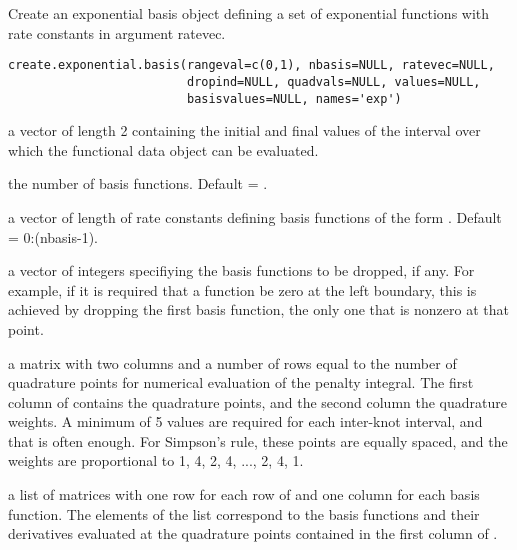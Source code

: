 \documentclass{article}
\begin{document}
\begin{Description}\relax
Create an exponential basis object defining a set of exponential
functions with rate constants in argument ratevec.
\end{Description}
\begin{Usage}
\begin{verbatim}
create.exponential.basis(rangeval=c(0,1), nbasis=NULL, ratevec=NULL,
                         dropind=NULL, quadvals=NULL, values=NULL,
                         basisvalues=NULL, names='exp')

\end{verbatim}
\end{Usage}
\begin{Arguments}
\begin{ldescription}
\item[\code{rangeval}] a vector of length 2 containing the initial and final values of the
interval over which the functional data object can be evaluated.

\item[\code{nbasis}] the number of basis functions.  Default = .

\item[\code{ratevec}] a vector of length  of rate constants defining basis
functions of the form .  Default = 0:(nbasis-1).

\item[\code{dropind}] a vector of integers specifiying the basis functions to be dropped,
if any.  For example, if it is required that a function be zero at
the left boundary, this is achieved by dropping the first basis
function, the only one that is nonzero at that point.

\item[\code{quadvals}] a matrix with two columns and a number of rows equal to the number
of quadrature points for numerical evaluation of the penalty
integral.  The first column of  contains the
quadrature points, and the second column the quadrature weights.  A
minimum of 5 values are required for each inter-knot interval, and
that is often enough.  For Simpson's rule, these points are equally
spaced, and the weights are proportional to 1, 4, 2, 4, ..., 2, 4,
1.

\item[\code{values}] a list of matrices with one row for each row of  and
one column for each basis function.  The elements of the list
correspond to the basis functions and their derivatives evaluated at
the quadrature points contained in the first column of
.


\end{ldescription}
\end{Arguments}
\end{document}
